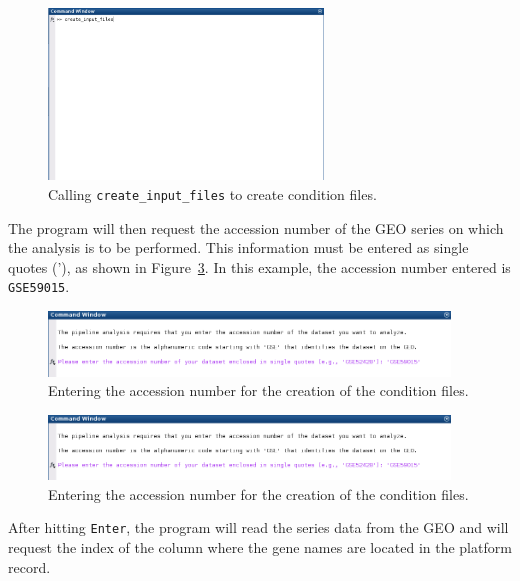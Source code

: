 \documentclass[final,letterpaper,12pt]{article}
\begin{document}
\begin{figure}
	\centering
	\includegraphics[width=0.65\textwidth]{create_input_files1}
	\caption{Calling \texttt{create\_input\_files} to create condition files.}
	\label{fig:create_input_files1}
\end{figure}

\par The program will then request the accession number of the GEO series on which the analysis is to be performed. This information must be entered as single quotes ('), as shown in  Figure~\ref{fig:create_input_files2}. In this example, the accession number entered is \texttt{GSE59015}.

\begin{figure}
	\centering
	\includegraphics[width=0.95\textwidth]{create_input_files2}
	\caption{Entering the accession number for the creation of the condition files.}
	\label{fig:create_input_files2}
\end{figure}

\begin{figure}
	\centering
	\includegraphics[width=0.95\textwidth]{create_input_files2}
	\caption{Entering the accession number for the creation of the condition files.}
	\label{fig:create_input_files2}
\end{figure}

\par After hitting \texttt{Enter}, the program will read the series data from the GEO and will request the index of the column where the gene names are located in the platform record.
\end{document}
